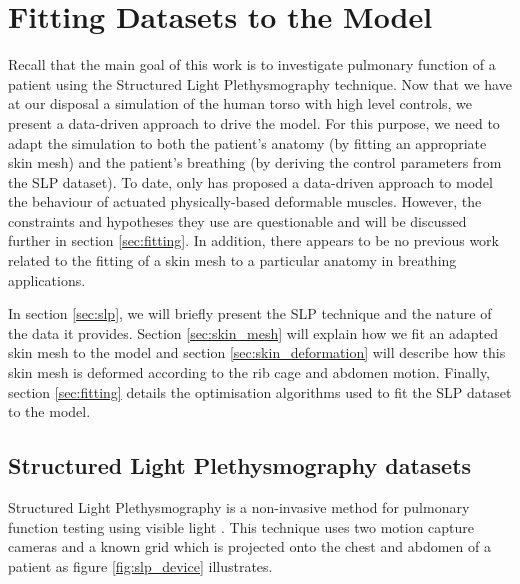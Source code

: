 \chapter{\label{ch:fitting_datasets}Fitting Datasets to the Model}
Recall that the main goal of this work is to investigate pulmonary function of a patient using the Structured Light Plethysmography technique. Now that we have at our disposal a simulation of the human torso with high level controls, we present a data-driven approach to drive the model. For this purpose, we need to adapt the simulation to both the patient's anatomy (by fitting an appropriate skin mesh) and the patient's breathing (by deriving the control parameters from the SLP dataset). To date, only \cite{dilorenzo2009breathing} has proposed a data-driven approach to model the behaviour of actuated physically-based deformable muscles. However, the constraints and hypotheses they use are questionable and will be discussed further in section \ref{sec:fitting}. In addition, there appears to be no previous work related to the fitting of a skin mesh to a particular anatomy in breathing applications.

In section \ref{sec:slp}, we will briefly present the SLP technique and the nature of the data it provides. Section \ref{sec:skin_mesh} will explain how we fit an adapted skin mesh to the model and section \ref{sec:skin_deformation} will describe how this skin mesh is deformed according to the rib cage and abdomen motion. Finally, section \ref{sec:fitting} details the optimisation algorithms used to fit the SLP dataset to the model.

\section{\label{sec:slp}Structured Light Plethysmography datasets}
Structured Light Plethysmography is a non-invasive method for pulmonary function testing using visible light \cite{slp2010}. This technique uses two motion capture cameras and a known grid which is projected onto the chest and abdomen of a patient as figure \ref{fig:slp_device} illustrates.

